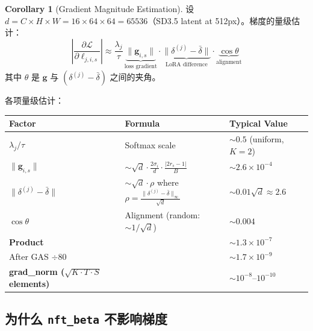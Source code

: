 \documentclass[11pt,a4paper]{article}
\newcommand{\loss}{\mathcal{L}}
\theoremstyle{definition}
\newtheorem{corollary}{Corollary}
\begin{document}
\begin{corollary}[Gradient Magnitude Estimation]
\label{cor:grad_estimate}
设 $d = C \times H \times W = 16 \times 64 \times 64 = 65536$（SD3.5 latent at 512px）。梯度的量级估计：
\begin{equation}
\left|\frac{\partial \loss}{\partial \ell_{j,i,s}}\right| \approx \frac{\lambda_j}{\tau}\,\underbrace{\|\mathbf{g}_{i,s}\|}_{\text{loss gradient}} \cdot \underbrace{\|\delta^{(j)} - \bar{\delta}\|}_{\text{LoRA difference}} \cdot \underbrace{\cos\theta}_{\text{alignment}}
\label{eq:grad_magnitude}
\end{equation}
其中 $\theta$ 是 $\mathbf{g}$ 与 $(\delta^{(j)} - \bar{\delta})$ 之间的夹角。

各项量级估计：
\begin{center}
\renewcommand{\arraystretch}{1.4}
\begin{tabular}{lll}
\toprule
\textbf{Factor} & \textbf{Formula} & \textbf{Typical Value} \\
\midrule
$\lambda_j / \tau$ & Softmax scale & $\sim 0.5$ (uniform, $K=2$) \\
$\|\mathbf{g}_{i,s}\|$ & $\sim \sqrt{d} \cdot \frac{2\sigma_i}{d} \cdot \frac{|2r_s - 1|}{B}$ & $\sim 2.6 \times 10^{-4}$ \\
$\|\delta^{(j)} - \bar{\delta}\|$ & $\sim \sqrt{d} \cdot \rho$ where $\rho = \frac{\|\delta^{(j)} - \bar{\delta}\|_{\infty}}{\sqrt{d}}$ & $\sim 0.01\sqrt{d} \approx 2.6$ \\
$\cos\theta$ & Alignment (random: $\sim 1/\sqrt{d}$) & $\sim 0.004$ \\
\midrule
\textbf{Product} & & $\sim 1.3 \times 10^{-7}$ \\
After GAS $\div 80$ & & $\sim 1.7 \times 10^{-9}$ \\
\textbf{grad\_norm ($\sqrt{K{\cdot}T{\cdot}S}$ elements)} & & $\sim 10^{-8}$--$10^{-10}$ \\
\bottomrule
\end{tabular}
\end{center}
\end{corollary}

\subsection{为什么 \texttt{nft\_beta} 不影响梯度}
\end{document}
